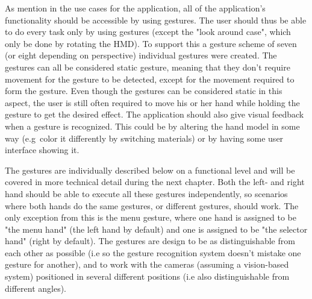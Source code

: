 
As mention in the use cases for the application, all of the application's functionality should be accessible by using gestures. The user should thus
be able to do every task only by using gestures (except the "look around case", which only be done by rotating the HMD). To support this a gesture scheme of seven (or eight depending
on perspective) individual gestures were created. The gestures can all be considered static gesture, meaning that they don't require movement for the gesture to be detected, 
except for the movement required to form the gesture. 
Even though the gestures can be considered static in this aspect, the user is still often required to move his or her hand while holding the gesture to get the desired effect. 
The application should also give visual feedback when a gesture is recognized. This could be by altering the hand model in some way (e.g~color it differently by
switching materials) or by having some user interface showing it. 


The gestures are individually described below on a functional level and will be covered in more technical detail during the next chapter. 
Both the left- and right hand should be able to execute all these gestures independently, so scenarios where both hands do the same gestures, or different gestures, should
work. The only exception from this is the menu gesture, where one hand is assigned to be "the menu hand" (the left hand by default) and one is assigned to be "the selector hand"
(right by default). The gestures are design to be as distinguishable from each other as possible (i.e so the gesture recognition system doesn't mistake one gesture for
another), and to work with the cameras (assuming a vision-based system) positioned in several different positions (i.e also distinguishable from different angles).

 
